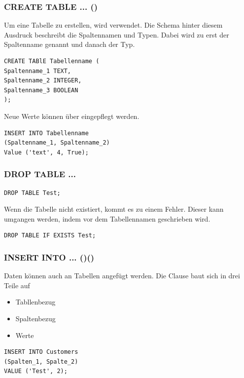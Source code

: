 \subsubsection{CREATE TABLE ... ()}
Um eine Tabelle zu erstellen, wird  verwendet.
Die Schema hinter diesem Ausdruck beschreibt die Spaltennamen und Typen.
Dabei wird zu erst der Spaltenname genannt und danach der Typ.


\begin{lstlisting}[style=SQL]
CREATE TABlE Tabellenname (
Spaltenname_1 TEXT,
Spaltenname_2 INTEGER,
Spaltenname_3 BOOLEAN
);
\end{lstlisting}
Neue Werte können über  eingepflegt werden.


\begin{lstlisting}[style=SQL]
INSERT INTO Tabellenname
(Spaltenname_1, Spaltenname_2)
Value ('text', 4, True);
\end{lstlisting}

\subsubsection{DROP TABLE ...}
\begin{lstlisting}[style=SQL]
DROP TABLE Test;
\end{lstlisting}

Wenn die Tabelle nicht existiert, kommt es zu einem Fehler. Dieser kann umgangen werden, indem  vor dem Tabellennamen geschrieben wird.

\begin{lstlisting}[style=SQL]
DROP TABLE IF EXISTS Test;
\end{lstlisting}

\subsubsection{INSERT INTO ... ()()}
Daten können auch an Tabellen angefügt werden.
Die  Clause baut sich in drei Teile auf
\begin{itemize}
\item Tabllenbezug
\item Spaltenbezug
\item Werte
\end{itemize}


\begin{lstlisting}[style=SQL]
INSERT INTO Customers
(Spalten_1, Spalte_2)
VALUE ('Test', 2);
\end{lstlisting}

